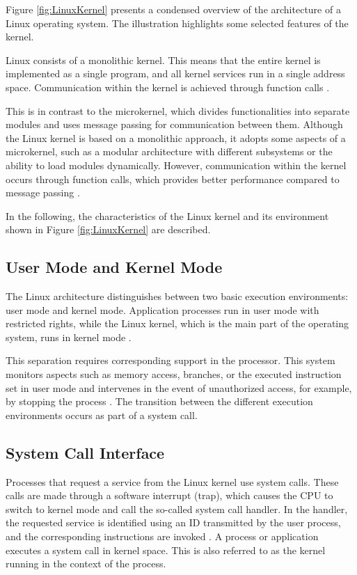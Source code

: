 Figure \ref{fig:LinuxKernel} presents a condensed overview of the architecture of a Linux operating system. The illustration highlights some selected features of the kernel.

Linux consists of a monolithic kernel. This means that the entire kernel is implemented as a single program, and all kernel services run in a single address space. Communication within the kernel is achieved through function calls \cite{like02}.

This is in contrast to the microkernel, which divides functionalities into separate modules and uses message passing for communication between them. Although the Linux kernel is based on a monolithic approach, it adopts some aspects of a microkernel, such as a modular architecture with different subsystems or the ability to load modules dynamically. However, communication within the kernel occurs through function calls, which provides better performance compared to message passing \cite{like08}.

In the following, the characteristics of the Linux kernel and its environment shown in Figure \ref{fig:LinuxKernel} are described.


\subsection{User Mode and Kernel Mode}

The Linux architecture distinguishes between two basic execution environments: user mode and kernel mode. Application processes run in user mode with restricted rights, while the Linux kernel, which is the main part of the operating system, runs in kernel mode \cite{like02}.

This separation requires corresponding support in the processor. This system monitors aspects such as memory access, branches, or the executed instruction set in user mode and intervenes in the event of unauthorized access, for example, by stopping the process \cite{like06}. The transition between the different execution environments occurs as part of a system call.


\subsection{System Call Interface}

Processes that request a service from the Linux kernel use system calls. These calls are made through a software interrupt (trap), which causes the CPU to switch to kernel mode and call the so-called system call handler. In the handler, the requested service is identified using an ID transmitted by the user process, and the corresponding instructions are invoked \cite{like02}. A process or application executes a system call in kernel space. This is also referred to as the kernel running in the context of the process.

